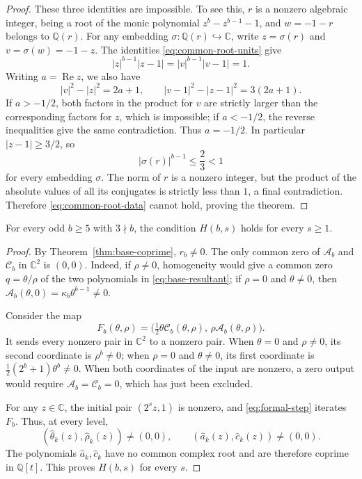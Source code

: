 \documentclass[12pt]{article}
\newcommand{\Q}{\mathbb{Q}}
\newcommand{\C}{\mathbb{C}}
\begin{document}
\begin{proof}
These three identities are impossible. To see this, $r$ is a
nonzero algebraic integer, being a root of the monic polynomial
$z^b-z^{b-1}-1$, and $w=-1-r$ belongs to $\Q(r)$.
For any embedding $\sigma:\Q(r)\hookrightarrow\C$, write
$z=\sigma(r)$ and $v=\sigma(w)=-1-z$. The identities
\eqref{eq:common-root-units} give
\[
 |z|^{b-1}|z-1|=|v|^{b-1}|v-1|=1.
\]
Writing $a=\operatorname{Re}z$, we also have
\[
 |v|^2-|z|^2=2a+1,\qquad
 |v-1|^2-|z-1|^2=3(2a+1).
\]
If $a>-1/2$, both factors in the product for $v$ are strictly
larger than the corresponding factors for $z$, which is
impossible; if $a<-1/2$, the reverse inequalities give the same
contradiction. Thus $a=-1/2$. In particular $|z-1|\ge3/2$, so
\[
 |\sigma(r)|^{b-1}\le\frac23<1
\]
for every embedding $\sigma$. The norm of $r$ is a nonzero integer,
but the product of the absolute values of all its conjugates is
strictly less than $1$, a final contradiction. Therefore
\eqref{eq:common-root-data} cannot hold, proving the theorem.
\end{proof}

\begin{samepage}
\begin{proposition}\label{prop:H-reduction}
For every odd $b\ge5$ with $3\nmid b$, the condition $H(b,s)$ holds for every $s\ge1$.
\end{proposition}
\end{samepage}
\begin{proof}
By Theorem~\ref{thm:base-coprime}, $r_b\ne0$. The only common zero of $\mathcal A_b$ and $\mathcal C_b$ in $\C^2$
is $(0,0)$. Indeed, if $\rho\ne0$, homogeneity would give a common zero
$q=\theta/\rho$ of the two polynomials in \eqref{eq:base-resultant};
if $\rho=0$ and $\theta\ne0$, then
$\mathcal A_b(\theta,0)=\kappa_b\theta^{b-1}\ne0$.

Consider the map
\begin{equation}\label{eq:homogeneous-map}
F_b(\theta,\rho)
=\bigl(\tfrac12\theta\mathcal C_b(\theta,\rho),\,
        \rho\mathcal A_b(\theta,\rho)\bigr).
\end{equation}
It sends every nonzero pair in $\C^2$ to a nonzero pair.
When $\theta=0$ and $\rho\ne0$, its second coordinate is $\rho^b\ne0$;
when $\rho=0$ and $\theta\ne0$, its first coordinate is
$\tfrac12(2^b+1)\theta^b\ne0$.
When both coordinates of the input are nonzero, a zero output would require
$\mathcal A_b=\mathcal C_b=0$, which has just been excluded.

For any $z\in\C$, the initial pair $(2^sz,1)$ is nonzero, and
\eqref{eq:formal-step} iterates $F_b$.
Thus, at every level,
\[
(\hat\theta_k(z),\hat\rho_k(z))\ne(0,0),\qquad
(\hat a_k(z),\hat c_k(z))\ne(0,0).
\]
The polynomials $\hat a_k,\hat c_k$ have no common complex root and are therefore
coprime in $\Q[t]$. This proves $H(b,s)$ for every $s$.
\end{proof}
\end{document}
